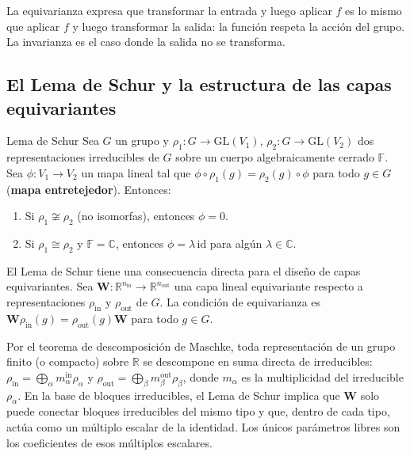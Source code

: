 La equivarianza expresa que transformar la entrada y luego aplicar $f$ es lo
mismo que aplicar $f$ y luego transformar la salida: la función respeta la
acción del grupo. La invarianza es el caso donde la salida no se transforma.

\subsection{El Lema de Schur y la estructura de las capas equivariantes}
\label{subsec:schur}

\begin{teorema}{Lema de Schur}
\label{lema:schur}
Sea $G$ un grupo y $\rho_1: G \to \mathrm{GL}(V_1)$, $\rho_2: G \to
\mathrm{GL}(V_2)$ dos representaciones irreducibles de $G$ sobre un cuerpo
algebraicamente cerrado $\mathbb{F}$. Sea $\phi: V_1 \to V_2$ un mapa lineal
tal que $\phi\circ\rho_1(g) = \rho_2(g)\circ\phi$ para todo $g \in G$
(\textbf{mapa entretejedor}). Entonces:
\begin{enumerate}
  \item Si $\rho_1 \not\cong \rho_2$ (no isomorfas), entonces $\phi = 0$.
  \item Si $\rho_1 \cong \rho_2$ y $\mathbb{F} = \mathbb{C}$, entonces
        $\phi = \lambda\,\mathrm{id}$ para algún $\lambda \in \mathbb{C}$.
\end{enumerate}
\end{teorema}

El Lema de Schur tiene una consecuencia directa para el diseño de capas
equivariantes. Sea $\bm{W}: \mathbb{R}^{n_{\mathrm{in}}} \to
\mathbb{R}^{n_{\mathrm{out}}}$ una capa lineal equivariante respecto a
representaciones $\rho_{\mathrm{in}}$ y $\rho_{\mathrm{out}}$ de $G$.
La condición de equivarianza es $\bm{W}\rho_{\mathrm{in}}(g) =
\rho_{\mathrm{out}}(g)\bm{W}$ para todo $g \in G$.

Por el teorema de descomposición de Maschke, toda representación de un grupo
finito (o compacto) sobre $\mathbb{R}$ se descompone en suma directa de
irreducibles: $\rho_{\mathrm{in}} = \bigoplus_\alpha m_\alpha^{\mathrm{in}}
\rho_\alpha$ y $\rho_{\mathrm{out}} = \bigoplus_\beta m_\beta^{\mathrm{out}}
\rho_\beta$, donde $m_\alpha$ es la multiplicidad del irreducible $\rho_\alpha$.
En la base de bloques irreducibles, el Lema de Schur implica que $\bm{W}$ solo
puede conectar bloques irreducibles del mismo tipo y que, dentro de cada tipo,
actúa como un múltiplo escalar de la identidad. Los únicos parámetros libres
son los coeficientes de esos múltiplos escalares.

